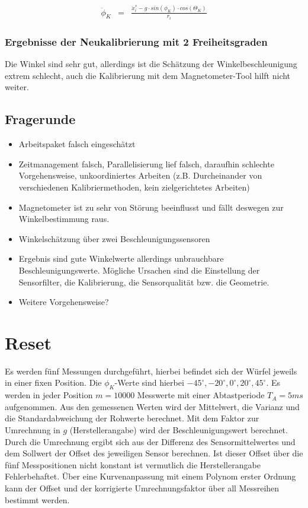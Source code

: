 \documentclass{article}
\begin{document}
\begin{equation}
\begin{array}{lcl}
\ddot{\phi}_K
& = &
\frac{\ddot{x}^s_i - g \cdot sin(\phi_K) \cdot cos(\Theta_K)}{r_i}
\end{array}
\end{equation}

\subsubsection{Ergebnisse der Neukalibrierung mit 2 Freiheitsgraden}
Die Winkel sind sehr gut, allerdings ist die Schätzung der Winkelbeschleunigung extrem schlecht, auch die Kalibrierung mit dem Magnetometer-Tool hilft nicht weiter.

\newpage
\subsection{Fragerunde}
\begin{itemize}
\item Arbeitspaket falsch eingeschätzt
\item Zeitmanagement falsch, Parallelisierung lief falsch, daraufhin schlechte Vorgehensweise, unkoordiniertes Arbeiten (z.B. Durcheinander von verschiedenen Kalibriermethoden, kein zielgerichtetes Arbeiten)
\item Magnetometer ist zu sehr von Störung beeinflusst und fällt deswegen zur Winkelbestimmung raus.
\item Winkelschätzung über zwei Beschleunigungssensoren
\item Ergebnis sind gute Winkelwerte allerdings unbrauchbare Beschleunigungswerte. Mögliche Ursachen sind die Einstellung der Sensorfilter, die Kalibrierung, die Sensorqualität bzw. die Geometrie.

\item Weitere Vorgehensweise? 
\end{itemize}


\newpage
\section{Reset}
Es werden fünf Messungen durchgeführt, hierbei befindet sich der Würfel jeweils in einer fixen Position. Die $\phi_K$-Werte sind hierbei $-45^\circ, -20^\circ, 0^\circ, 20^\circ, 45^\circ$. Es werden in jeder Position $m = 10000$ Messwerte mit einer Abtastperiode $T_A = 5ms$ aufgenommen. Aus den gemessenen Werten wird der Mittelwert, die Varianz und die Standardabweichung der Rohwerte berechnet. Mit dem Faktor zur Umrechnung in $g$ (Herstellerangabe) wird der Beschleunigungswert berechnet. Durch die Umrechnung ergibt sich aus der Differenz des Sensormittelwertes und dem Sollwert der Offset des jeweiligen Sensor berechnen. Ist dieser Offset über die fünf Messpositionen nicht konstant ist vermutlich die Herstellerangabe Fehlerbehaftet. Über eine Kurvenanpassung mit einem Polynom erster Ordnung kann der Offset und der korrigierte Umrechnungsfaktor über all Messreihen bestimmt werden.
\end{document}
